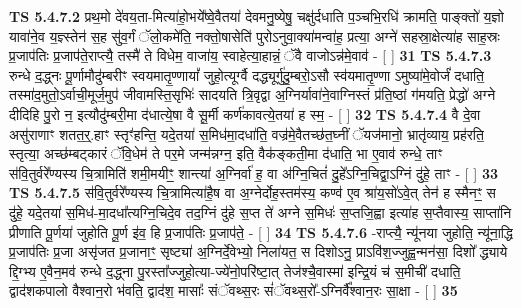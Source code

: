 \documentclass[17pt]{extarticle}
\begin{document}
                  \newline
                                \textbf{ TS 5.4.7.2} \newline
                  प्रथ॒मो दे॑वय॒ता-मित्या॑हो॒भये᳚ष्वे॒वैतया॑ देवमनु॒ष्येषु॒ चक्षु॑र्दधाति प॒ञ्चभि॒रधि॑ क्रामति॒ पाङ्क्तो॑ य॒ज्ञो यावा॑ने॒व य॒ज्ञ्स्तेन॑ स॒ह सु॑व॒र्गं ॅलो॒कमे॑ति॒ नक्तो॒षासेति॑ पुरोऽनुवा॒क्या॑मन्वा॑ह॒ प्रत्या॒ अग्ने॑ सहस्रा॒क्षेत्या॑ह साह॒स्रः प्र॒जाप॑तिः प्र॒जाप॑ते॒राप्त्यै॒ तस्मै॑ ते विधेम॒ वाजा॑य॒ स्वाहेत्या॒हान्नं॒ ॅवै वाजोऽन्न॑मे॒वाव॑ - [  ] \textbf{  31} \newline
                  \newline
                                \textbf{ TS 5.4.7.3} \newline
                  रुन्धे द॒द्ध्नः पू॒र्णामौदु॑म्बरीꣳ स्वयमातृ॒ण्णायां᳚ जुहो॒त्यूर्ग्वै दद्ध्यूर्गु॑दु॒म्बरो॒ऽसौ स्व॑यमातृ॒ण्णा ऽमुष्या॑मे॒वोर्जं॑ दधाति॒ तस्मा॑द॒मुतो॒ऽर्वाची॒मूर्ज॒मुप॑ जीवामस्ति॒सृभिः॑ सादयति त्रि॒वृद्वा अ॒ग्निर्यावा॑ने॒वाग्निस्तं प्र॑ति॒ष्ठां ग॑मयति॒ प्रेद्धो॑ अग्ने दीदिहि पु॒रो न॒ इत्यौदु॑म्बरी॒मा द॑धात्ये॒षा वै सू॒र्मी कर्ण॑कावत्ये॒तया॑ ह स्म॒ - [  ] \textbf{  32} \newline
                  \newline
                                \textbf{ TS 5.4.7.4} \newline
                  वै दे॒वा असु॑राणाꣳ शतत॒र्॒.हाꣳ स्तृꣳ॑हन्ति॒ यदे॒तया॑ स॒मिध॑मा॒दधा॑ति॒ वज्र॑मे॒वैतच्छ॑त॒घ्नीं ॅयज॑मानो॒ भ्रातृ॑व्याय॒ प्रह॑रति॒ स्तृत्या॒ अच्छ॑म्बट्कारं ॅवि॒धेम॑ ते पर॒मे जन्म॑न्नग्न॒ इति॒ वैक॑ङ्कती॒मा द॑धाति॒ भा ए॒वाव॑ रुन्धे॒ ताꣳ स॑वि॒तुर्वरे᳚ण्यस्य चि॒त्रामिति॑ शमी॒मयीꣳ॒॒ शान्त्या॑ अ॒ग्निर्वा॑ ह॒ वा अ॑ग्नि॒चितं॑ दु॒हे᳚ऽग्नि॒चिद्वा॒ऽग्निं दु॑हे॒ ताꣳ - [  ] \textbf{  33} \newline
                  \newline
                                \textbf{ TS 5.4.7.5} \newline
                  स॑वि॒तुर्वरे᳚ण्यस्य चि॒त्रामित्या॑है॒ष वा अ॒ग्नेर्दोह॒स्तम॑स्य॒ कण्व॑ ए॒व श्रा॑य॒सो॑ऽवे॒त् तेन॑ ह स्मैनꣳ॒॒ स दु॑हे॒ यदे॒तया॑ स॒मिध॑-मा॒दधा᳚त्यग्नि॒चिदे॒व तद॒ग्निं दु॑हे स॒प्त ते॑ अग्ने स॒मिधः॑ स॒प्तजि॒ह्वा इत्या॑ह स॒प्तैवास्य॒ साप्ता॑नि प्रीणाति पू॒र्णया॑ जुहोति पू॒र्ण इ॑व॒ हि प्र॒जाप॑तिः प्र॒जाप॑ते॒ - [  ] \textbf{  34} \newline
                  \newline
                                \textbf{ TS 5.4.7.6} \newline
                  -राप्त्यै॒ न्यू॑नया जुहोति॒ न्यू॑ना॒द्धि प्र॒जाप॑तिः प्र॒जा असृ॑जत प्र॒जानाꣳ॒॒ सृष्ट्या॑ अ॒ग्निर्दे॒वेभ्यो॒ निला॑यत॒ स दिशोऽनु॒ प्राऽवि॑श॒ज्जुह्व॒न्मन॑सा॒ दिशो᳚ द्ध्याये द्दि॒ग्भ्य ए॒वैन॒मव॑ रुन्धे द॒द्ध्ना पु॒रस्ता᳚ज्जुहो॒त्या-ज्ये॑नो॒परि॑ष्टा॒त् तेज॑श्चै॒वास्मा॑ इन्द्रि॒यं च॑ स॒मीची॑ दधाति॒ द्वाद॑शकपालो वैश्वान॒रो भ॑वति॒ द्वाद॑श॒ मासाः᳚ संॅवथ्स॒रः सं॑ॅवथ्स॒रो᳚-ऽग्निर्वै᳚श्वान॒रः सा॒क्षा - [  ] \textbf{  35} \newline
\end{document}
